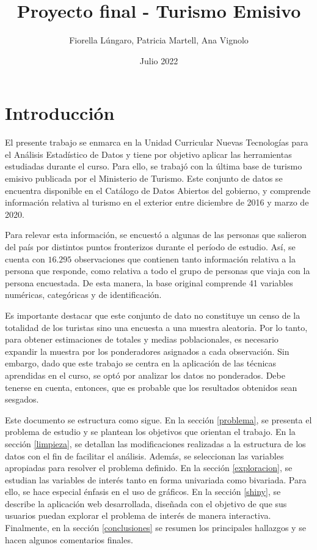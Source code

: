 \documentclass[
]{article}
\title{Proyecto final - Turismo Emisivo}
\author{Fiorella Lúngaro, Patricia Martell, Ana Vignolo}
\date{Julio 2022}
\begin{document}
\maketitle

{
\setcounter{tocdepth}{2}
\tableofcontents
}
\nocite{R} \nocite{GGplot} \nocite{Shiny} \nocite{tidyverse}
\nocite{readxl} \nocite{lubridate} \nocite{forcats} \nocite{ggplot2}
\nocite{here} \nocite{patchwork}

\newpage

\hypertarget{introducciuxf3n}{%
\section{\texorpdfstring{Introducción
\label{introduccion}}{Introducción }}\label{introducciuxf3n}}

El presente trabajo se enmarca en la Unidad Curricular Nuevas
Tecnologías para el Análisis Estadístico de Datos y tiene por objetivo
aplicar las herramientas estudiadas durante el curso. Para ello, se
trabajó con la última base de turismo emisivo publicada por el
Ministerio de Turismo. Este conjunto de datos se encuentra disponible en
el Catálogo de Datos Abiertos del gobierno, y comprende información
relativa al turismo en el exterior entre diciembre de 2016 y marzo de
2020.

Para relevar esta información, se encuestó a algunas de las personas que
salieron del país por distintos puntos fronterizos durante el período de
estudio. Así, se cuenta con \(16.295\) observaciones que contienen tanto
información relativa a la persona que responde, como relativa a todo el
grupo de personas que viaja con la persona encuestada. De esta manera,
la base original comprende 41 variables numéricas, categóricas y de
identificación.

Es importante destacar que este conjunto de dato no constituye un censo
de la totalidad de los turistas sino una encuesta a una muestra
aleatoria. Por lo tanto, para obtener estimaciones de totales y medias
poblacionales, es necesario expandir la muestra por los ponderadores
asignados a cada observación. Sin embargo, dado que este trabajo se
centra en la aplicación de las técnicas aprendidas en el curso, se optó
por analizar los datos no ponderados. Debe tenerse en cuenta, entonces,
que es probable que los resultados obtenidos sean sesgados.

Este documento se estructura como sigue. En la sección \ref{problema},
se presenta el problema de estudio y se plantean los objetivos que
orientan el trabajo. En la sección \ref{limpieza}, se detallan las
modificaciones realizadas a la estructura de los datos con el fin de
facilitar el análisis. Además, se seleccionan las variables apropiadas
para resolver el problema definido. En la sección \ref{exploracion}, se
estudian las variables de interés tanto en forma univariada como
bivariada. Para ello, se hace especial énfasis en el uso de gráficos. En
la sección \ref{shiny}, se describe la aplicación web desarrollada,
diseñada con el objetivo de que sus usuarios puedan explorar el problema
de interés de manera interactiva. Finalmente, en la sección
\ref{conclusiones} se resumen los principales hallazgos y se hacen
algunos comentarios finales.
\end{document}
